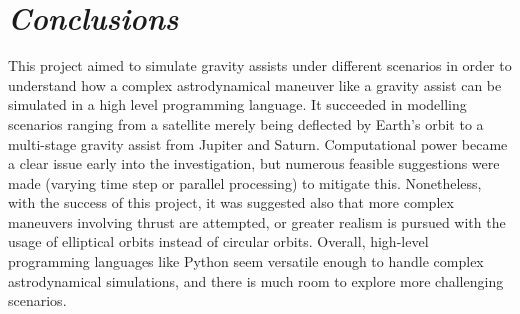 \documentclass[11pt, english]{report}
\makeatletter
\renewcommand{\cftchappresnum}{Chapter }
\newcommand*\updatechaptername{%
	\addtocontents{toc}{\protect\renewcommand*\protect\cftchappresnum{\@chapapp\ }}
}
\renewcommand{\thefigure}{\Roman{chapter}.\arabic{figure}}
\renewcommand{\thetable}{\Roman{chapter}.\arabic{table}}
\makeatother
\begin{document}
%

\chapter{\textsl{Conclusions}}

\normalsize{\noindent This project aimed to simulate gravity assists under different scenarios in order to understand how a complex astrodynamical maneuver like a gravity assist can be simulated in a high level programming language. It succeeded in modelling scenarios ranging from a satellite merely being deflected by Earth's orbit to a multi-stage gravity assist from Jupiter and Saturn. Computational power became a clear issue early into the investigation, but numerous feasible suggestions were made (varying time step or parallel processing) to mitigate this. Nonetheless, with the success of this project, it was suggested also that more complex maneuvers involving thrust are attempted, or greater realism is pursued with the usage of elliptical orbits instead of circular orbits. Overall, high-level programming languages like Python seem versatile enough to handle complex astrodynamical simulations, and there is much room to explore more challenging scenarios.}

%


\printbibliography
\clearpage

\renewcommand{\thefigure}{\Alph{chapter}.\arabic{figure}}
\renewcommand{\thetable}{\Alph{chapter}.\arabic{table}}

\updatechaptername
%
\end{document}
